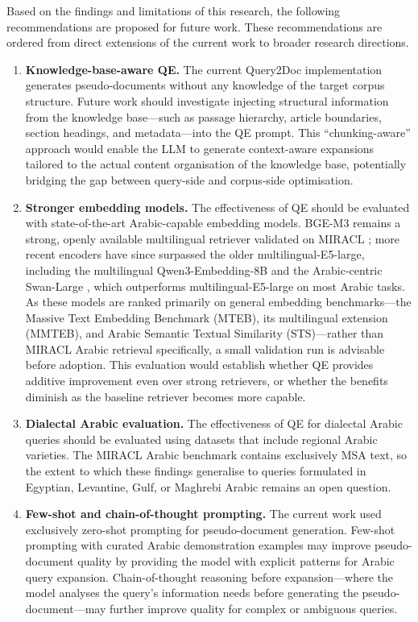 Based on the findings and limitations of this research, the following recommendations are proposed for future work. These recommendations are ordered from direct extensions of the current work to broader research directions.

\begin{enumerate}[label=\roman*.]
    \item \textbf{Knowledge-base-aware QE.} The current Query2Doc implementation generates pseudo-documents without any knowledge of the target corpus structure. Future work should investigate injecting structural information from the knowledge base---such as passage hierarchy, article boundaries, section headings, and metadata---into the QE prompt. This ``chunking-aware'' approach would enable the LLM to generate context-aware expansions tailored to the actual content organisation of the knowledge base, potentially bridging the gap between query-side and corpus-side optimisation.

    \item \textbf{Stronger embedding models.} The effectiveness of QE should be evaluated with state-of-the-art Arabic-capable embedding models. BGE-M3 remains a strong, openly available multilingual retriever validated on MIRACL \cite{alsubhi_2025_optimizing}; more recent encoders have since surpassed the older multilingual-E5-large, including the multilingual Qwen3-Embedding-8B \cite{qwen3emb_2025} and the Arabic-centric Swan-Large \cite{alwajih_2024_swan}, which outperforms multilingual-E5-large on most Arabic tasks. As these models are ranked primarily on general embedding benchmarks---the Massive Text Embedding Benchmark (MTEB), its multilingual extension (MMTEB), and Arabic Semantic Textual Similarity (STS)---rather than MIRACL Arabic retrieval specifically, a small validation run is advisable before adoption. This evaluation would establish whether QE provides additive improvement even over strong retrievers, or whether the benefits diminish as the baseline retriever becomes more capable.

    \item \textbf{Dialectal Arabic evaluation.} The effectiveness of QE for dialectal Arabic queries should be evaluated using datasets that include regional Arabic varieties. The MIRACL Arabic benchmark contains exclusively MSA text, so the extent to which these findings generalise to queries formulated in Egyptian, Levantine, Gulf, or Maghrebi Arabic remains an open question.

    \item \textbf{Few-shot and chain-of-thought prompting.} The current work used exclusively zero-shot prompting for pseudo-document generation. Few-shot prompting with curated Arabic demonstration examples may improve pseudo-document quality by providing the model with explicit patterns for Arabic query expansion. Chain-of-thought reasoning before expansion---where the model analyses the query's information needs before generating the pseudo-document---may further improve quality for complex or ambiguous queries.


\end{enumerate}
